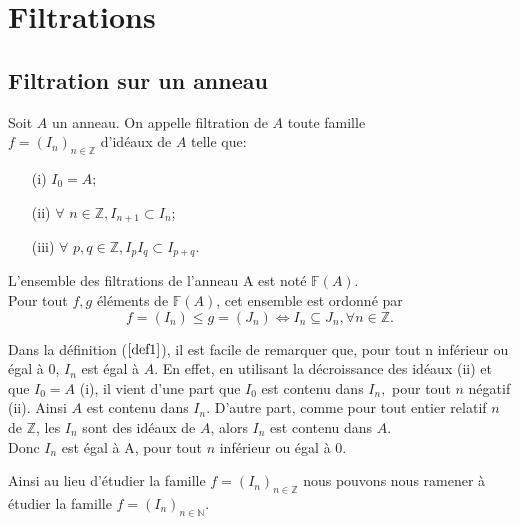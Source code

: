\section{Filtrations}
\subsection{Filtration sur un anneau}
\begin{madefinition}
	\label{def1}
	Soit $A$ un anneau. On appelle filtration de $A$ toute famille\\ $f = (I_n)_{n \in \mathbb{Z}}$ d'idéaux de $A$ telle que:
	\begin{enumerate}
		\item[(i)] $I_0 = A$;
		\item[(ii)] $ \forall $  $n \in \mathbb{Z}, I_{n+1} \subset I_n$;
		\item[(iii)] $ \forall $  $p,q \in \mathbb{Z}, I_pI_q \subset I_{p+q}$.
	\end{enumerate}
	L'ensemble des filtrations de l'anneau A est noté $\mathbb{F}(A)$.\\
	Pour tout  $f,g$ éléments de $\mathbb{F}(A)$, cet ensemble est ordonné par
	\[f = (I_n) \leqslant g = (J_n) \Longleftrightarrow  I_n \subseteq J_n , \forall n \in \mathbb{Z}.\]
\end{madefinition}
\begin{maremarque}
	Dans la définition ($\ref{def1}$), il est facile de remarquer que, pour tout n inférieur ou égal à 0, $I_n$ est égal à $A$. En effet, en utilisant la décroissance des idéaux (ii) et que $I_0 = A$ (i), il vient d'une part que $I_0$ est contenu dans $I_n ,$ pour tout $n $ négatif (ii). Ainsi $A$ est contenu dans $ I_n$.
	D'autre part, comme pour tout entier relatif $ n$ de $\mathbb{Z}$, les $I_n$ sont des idéaux de $A$, alors $I_n$ est contenu dans $A$.\\
	Donc $I_n$ est égal à A, pour tout $ n$ inférieur ou égal à $0$.
\end{maremarque}
Ainsi au lieu d'étudier la famille $f = (I_n)_{n \in \mathbb{Z}}$ nous pouvons nous ramener à étudier la famille $f = (I_n)_{n \in \mathbb{N}}$.

